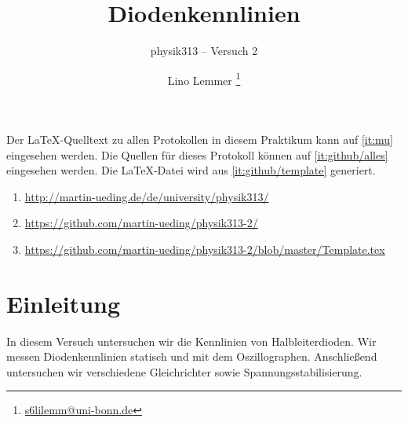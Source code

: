 


\usepackage{placeins}



\subject{Praktikumsprotokoll}
\title{Diodenkennlinien}
\subtitle{physik313 – Versuch 2}
\author{
	Lino Lemmer \footnote{\href{mailto:s6lilemm@uni-bonn.de}{s6lilemm@uni-bonn.de}}
}




\maketitle

Der \LaTeX-Quelltext zu allen Protokollen in diesem Praktikum kann auf
\ref{it:mu} eingesehen werden. Die Quellen für dieses Protokoll können auf
\ref{it:github/alles} eingesehen werden. Die \LaTeX-Datei wird aus
\ref{it:github/template} generiert.

\begin{enumerate}
	\item
		\label{it:mu}
		\url{http://martin-ueding.de/de/university/physik313/}
	\item
		\label{it:github/alles}
		\url{https://github.com/martin-ueding/physik313-2/}
	\item
		\label{it:github/template}
		\url{https://github.com/martin-ueding/physik313-2/blob/master/Template.tex}
\end{enumerate}

\newpage
\tableofcontents
\newpage


\FloatBarrier
\section{Einleitung}

In diesem Versuch untersuchen wir die Kennlinien von Halbleiterdioden. Wir
messen Diodenkennlinien statisch und mit dem Oszillographen. Anschließend
untersuchen wir verschiedene Gleichrichter sowie Spannungsstabilisierung.

